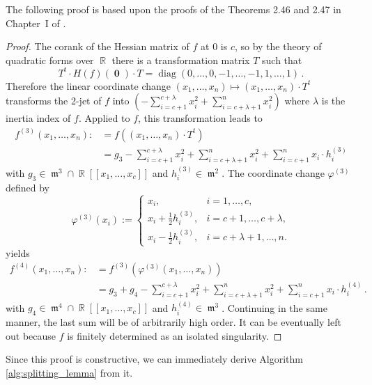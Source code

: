 \documentclass[noend]{amsproc}
\theoremstyle{definition}
\DeclareMathOperator{\m}{\mathfrak{m}}
\DeclareMathOperator{\diag}{diag}
\DeclareMathOperator{\R}{\mathbb{R}}
\DeclareMathOperator{\boldzero}{\mathbf{0}}
\begin{document}
The following proof is based upon the proofs of the Theorems 2.46 and 2.47 in
Chapter~I of \citet{GLS2007}.

\begin{proof}
The corank of the Hessian matrix of $f$ at $0$ is $c$, so by the theory of
quadratic forms over $\R$ there is a transformation matrix $T$ such that
\[
T^t \cdot H(f)(\boldzero) \cdot T = \diag(0,\ldots,0,-1,\ldots,-1,1,\ldots,1)
\,.
\]
Therefore the linear coordinate change
$(x_1,\ldots,x_n) \mapsto (x_1,\ldots,x_n) \cdot T^t$ transforms the 2-jet of
$f$ into
$\left(-\sum_{i=c+1}^{c+\lambda} x_i^2 +\sum_{i=c+\lambda+1}^n x_i^2\right)$
where $\lambda$ is the inertia index of $f$.
Applied to $f$, this transformation leads to
\begin{align*}
f^{(3)} (x_1,\ldots,x_n)
  :\!&= f((x_1,\ldots,x_n) \cdot T^t) \\
  &= g_3
  -\sum_{i=c+1}^{c+\lambda} x_i^2 +\sum_{i=c+\lambda+1}^n x_i^2
  +\sum_{i=c+1}^n x_i\cdot h_i^{(3)}
\end{align*}
with $g_3 \in \m^3 \cap \R[[x_1,\ldots,x_c]]$ and $h_i^{(3)} \in \m^2$. The
coordinate change $\varphi^{(3)}$ defined by
\[
\varphi^{(3)}(x_i) :=
\begin{cases}
x_i,                      &i = 1, \ldots, c, \\
x_i+\frac{1}{2}h_i^{(3)}, &i = c+1, \ldots, c+\lambda, \\
x_i-\frac{1}{2}h_i^{(3)}, &i = c+\lambda+1, \ldots, n.
\end{cases}
\]
yields
\begin{align*}
f^{(4)} (x_1,\ldots,x_n)
  :\!&= f^{(3)}(\varphi^{(3)}(x_1,\ldots,x_n)) \\
  &= g_3 +g_4
  -\sum_{i=c+1}^{c+\lambda} x_i^2 +\sum_{i=c+\lambda+1}^n x_i^2
  +\sum_{i=c+1}^n x_i\cdot h_i^{(4)} \,.
\end{align*}
with $g_4 \in \m^4 \cap \R[[x_1,\ldots,x_c]]$ and $h_i^{(4)} \in \m^3$.
Continuing in the same manner, the last sum will be of arbitrarily high order.
It can be eventually left out because $f$ is finitely determined as an isolated
singularity.
\end{proof}

Since this proof is constructive, we can immediately derive Algorithm
\ref{alg:splitting_lemma} from it.
\end{document}

